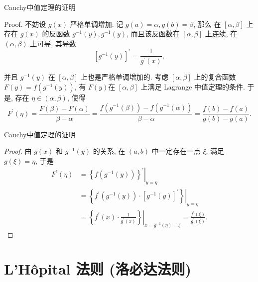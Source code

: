 \documentclass[
10pt,
aspectratio=43,
]{beamer}
\begin{document}
\begin{frame}{Cauchy中值定理的证明}
	\begin{block}{Proof.}
		不妨设 $g(x)$ 严格单调增加.	记 $g(a)=\alpha, g(b)=\beta$, 那么 在 $[\alpha, \beta]$ 上存在 $g(x)$ 的反函数 $g^{-1}(y), g^{-1}(y)$, 而且该反函数在 $[\alpha, \beta]$ 上连续, 在 $(\alpha, \beta)$ 上可导, 其导数
		$$
			\left[g^{-1}(y)\right]^{\prime}=\frac{1}{g^{\prime}(x)},
		$$

		并且 $g^{-1}(y)$ 在 $[\alpha, \beta]$ 上也是严格单调增加的. \pause
		考虑 $[\alpha, \beta]$ 上的复合函数 $F(y)=f\left(g^{-1}(y)\right)$, 有 $F(y)$在 $[\alpha, \beta]$ 上满足 Lagrange 中值定理的条件. \pause 于是, 存在 $\eta \in(\alpha, \beta)$, 使得
		$$
			F^{\prime}(\eta)=\frac{F(\beta)-F(\alpha)}{\beta-\alpha}=\frac{f\left(g^{-1}(\beta)\right)-f\left(g^{-1}(\alpha)\right)}{\beta-\alpha}=\frac{f(b)-f(a)}{g(b)-g(a)} .
		$$

	\end{block}
\end{frame}


\begin{frame}{Cauchy中值定理的证明}
	\begin{proof}
		由 $g(x)$ 和 $g^{-1}(y)$ 的关系, 在 $(a, b)$ 中一定存在一点 $\xi$, 满足 $g(\xi)=\eta$, 于是
		$$
			\begin{aligned}
				F^{\prime}(\eta) & =\left.\left\{f\left(g^{-1}(y)\right)\right\}^{\prime}\right|_{y=\eta}                                                                  \\
				                 & =\left.\left\{f^{\prime}\left(g^{-1}(y)\right) \cdot\left[g^{-1}(y)\right]^{\prime}\right\}\right|_{y=\eta}                             \\
				                 & =\left.\left\{f^{\prime}(x) \cdot \frac{1}{g^{\prime}(x)}\right\}\right|_{x=g^{-1}(\eta)=\xi}=\frac{f^{\prime}(\xi)}{g^{\prime}(\xi)} .
			\end{aligned}
		$$
	\end{proof}
\end{frame}

\section{L'Hôpital 法则 (洛必达法则)}
\end{document}
